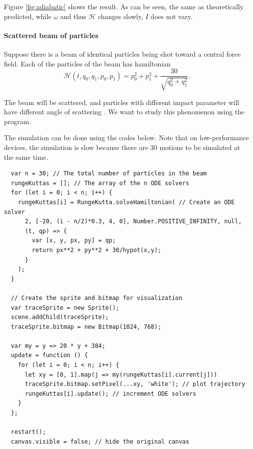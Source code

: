 \documentclass[12pt]{article}
\begin{document}
Figure \ref{fig:adiabatic} shows the result.
As can be seen, the same as theoretically predicted,
while $\omega$ and thus $\mathcal H$ changes slowly, $I$ does not vary.

\paragraph{Scattered beam of particles}

Suppose there is a beam of identical particles being shot toward a central force field.
Each of the particles of the beam has hamiltonian
\begin{equation*}
  \mathcal H\left(t,q_0,q_1,p_0,p_1\right)=p_0^2+p_1^2+\frac{30}{\sqrt{q_0^2+q_1^2}}.
\end{equation*}

The beam will be scattered, and particles with different impact parameter will
have different angle of scattering \cite[p. 49]{landau1976mechanics}.
We want to study this phenomenon using the program.

The simulation can be done using the codes below.
Note that on low-performance devices, the simulation is slow
because there are 30 motions to be simulated at the same time.

\begin{verbatim}
  var n = 30; // The total number of particles in the beam
  rungeKuttas = []; // The array of the n ODE solvers
  for (let i = 0; i < n; i++) {
    rungeKuttas[i] = RungeKutta.solveHamiltonian( // Create an ODE solver
      2, [-20, (i - n/2)*0.3, 4, 0], Number.POSITIVE_INFINITY, null,
      (t, qp) => {
        var [x, y, px, py] = qp;
        return px**2 + py**2 + 30/hypot(x,y);
      }
    );
  }

  // Create the sprite and bitmap for visualization
  var traceSprite = new Sprite();
  scene.addChild(traceSprite);
  traceSprite.bitmap = new Bitmap(1024, 768);

  var my = y => 20 * y + 384;
  update = function () {
    for (let i = 0; i < n; i++) {
      let xy = [0, 1].map(j => my(rungeKuttas[i].current[j]))
      traceSprite.bitmap.setPixel(...xy, 'white'); // plot trajectory
      rungeKuttas[i].update(); // increment ODE solvers
    }
  };

  restart();
  canvas.visible = false; // hide the original canvas
\end{verbatim}
\end{document}
